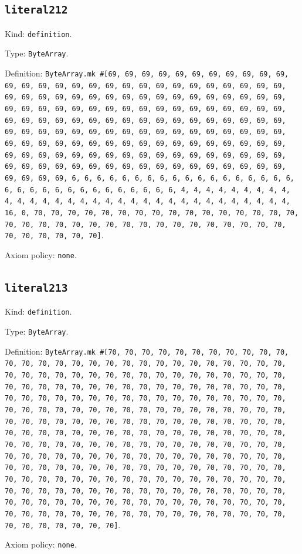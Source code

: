 \documentclass[11pt]{article}
\begin{document}
\subsection*{\texttt{literal212}}
\noindent Kind: \texttt{definition}.\par
\noindent Type: \texttt{ByteArray}.\par
\noindent Definition: \texttt{ByteArray.mk \#[69, 69, 69, 69, 69, 69, 69, 69, 69, 69, 69, 69, 69, 69, 69, 69, 69, 69, 69, 69, 69, 69, 69, 69, 69, 69, 69, 69, 69, 69, 69, 69, 69, 69, 69, 69, 69, 69, 69, 69, 69, 69, 69, 69, 69, 69, 69, 69, 69, 69, 69, 69, 69, 69, 69, 69, 69, 69, 69, 69, 69, 69, 69, 69, 69, 69, 69, 69, 69, 69, 69, 69, 69, 69, 69, 69, 69, 69, 69, 69, 69, 69, 69, 69, 69, 69, 69, 69, 69, 69, 69, 69, 69, 69, 69, 69, 69, 69, 69, 69, 69, 69, 69, 69, 69, 69, 69, 69, 69, 69, 69, 69, 69, 69, 69, 69, 69, 69, 69, 69, 69, 69, 69, 69, 69, 69, 69, 69, 69, 69, 69, 69, 69, 69, 69, 69, 69, 69, 69, 69, 69, 69, 69, 69, 69, 69, 69, 69, 69, 69, 69, 6, 6, 6, 6, 6, 6, 6, 6, 6, 6, 6, 6, 6, 6, 6, 6, 6, 6, 6, 6, 6, 6, 6, 6, 6, 6, 6, 6, 6, 6, 6, 6, 4, 4, 4, 4, 4, 4, 4, 4, 4, 4, 4, 4, 4, 4, 4, 4, 4, 4, 4, 4, 4, 4, 4, 4, 4, 4, 4, 4, 4, 4, 4, 4, 16, 0, 70, 70, 70, 70, 70, 70, 70, 70, 70, 70, 70, 70, 70, 70, 70, 70, 70, 70, 70, 70, 70, 70, 70, 70, 70, 70, 70, 70, 70, 70, 70, 70, 70, 70, 70, 70, 70, 70, 70]}.\par
\noindent Axiom policy: \texttt{none}.\par
\subsection*{\texttt{literal213}}
\noindent Kind: \texttt{definition}.\par
\noindent Type: \texttt{ByteArray}.\par
\noindent Definition: \texttt{ByteArray.mk \#[70, 70, 70, 70, 70, 70, 70, 70, 70, 70, 70, 70, 70, 70, 70, 70, 70, 70, 70, 70, 70, 70, 70, 70, 70, 70, 70, 70, 70, 70, 70, 70, 70, 70, 70, 70, 70, 70, 70, 70, 70, 70, 70, 70, 70, 70, 70, 70, 70, 70, 70, 70, 70, 70, 70, 70, 70, 70, 70, 70, 70, 70, 70, 70, 70, 70, 70, 70, 70, 70, 70, 70, 70, 70, 70, 70, 70, 70, 70, 70, 70, 70, 70, 70, 70, 70, 70, 70, 70, 70, 70, 70, 70, 70, 70, 70, 70, 70, 70, 70, 70, 70, 70, 70, 70, 70, 70, 70, 70, 70, 70, 70, 70, 70, 70, 70, 70, 70, 70, 70, 70, 70, 70, 70, 70, 70, 70, 70, 70, 70, 70, 70, 70, 70, 70, 70, 70, 70, 70, 70, 70, 70, 70, 70, 70, 70, 70, 70, 70, 70, 70, 70, 70, 70, 70, 70, 70, 70, 70, 70, 70, 70, 70, 70, 70, 70, 70, 70, 70, 70, 70, 70, 70, 70, 70, 70, 70, 70, 70, 70, 70, 70, 70, 70, 70, 70, 70, 70, 70, 70, 70, 70, 70, 70, 70, 70, 70, 70, 70, 70, 70, 70, 70, 70, 70, 70, 70, 70, 70, 70, 70, 70, 70, 70, 70, 70, 70, 70, 70, 70, 70, 70, 70, 70, 70, 70, 70, 70, 70, 70, 70, 70, 70, 70, 70, 70, 70, 70, 70, 70, 70, 70, 70, 70, 70, 70, 70, 70, 70, 70, 70, 70, 70, 70, 70, 70]}.\par
\noindent Axiom policy: \texttt{none}.\par
\end{document}
